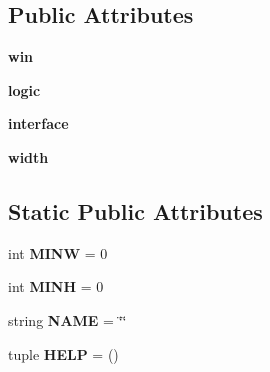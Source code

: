 \subsection*{\-Public \-Attributes}
\begin{DoxyCompactItemize}
\item 
\hypertarget{classplugins_1_1plugincurses_1_1_curses_plugin_a6bce789b5316e34676d0d2a3f3268ae9}{{\bfseries win}}\label{classplugins_1_1plugincurses_1_1_curses_plugin_a6bce789b5316e34676d0d2a3f3268ae9}

\item 
\hypertarget{classplugins_1_1plugincurses_1_1_curses_plugin_ae119ba111e0adc563144ec81fadb2c89}{{\bfseries logic}}\label{classplugins_1_1plugincurses_1_1_curses_plugin_ae119ba111e0adc563144ec81fadb2c89}

\item 
\hypertarget{classplugins_1_1plugincurses_1_1_curses_plugin_a36a19c75fe901ff81d68fb35048b5498}{{\bfseries interface}}\label{classplugins_1_1plugincurses_1_1_curses_plugin_a36a19c75fe901ff81d68fb35048b5498}

\item 
\hypertarget{classplugins_1_1plugincurses_1_1_curses_plugin_adc1318d78532f6d204e2290ec934f54b}{{\bfseries width}}\label{classplugins_1_1plugincurses_1_1_curses_plugin_adc1318d78532f6d204e2290ec934f54b}

\end{DoxyCompactItemize}
\subsection*{\-Static \-Public \-Attributes}
\begin{DoxyCompactItemize}
\item 
\hypertarget{classplugins_1_1plugincurses_1_1_curses_plugin_ad61b4ee3046c6e4e18a8b141c34f8346}{int {\bfseries \-M\-I\-N\-W} = 0}\label{classplugins_1_1plugincurses_1_1_curses_plugin_ad61b4ee3046c6e4e18a8b141c34f8346}

\item 
\hypertarget{classplugins_1_1plugincurses_1_1_curses_plugin_aaf98cf7e436034e64a826f45788f552c}{int {\bfseries \-M\-I\-N\-H} = 0}\label{classplugins_1_1plugincurses_1_1_curses_plugin_aaf98cf7e436034e64a826f45788f552c}

\item 
\hypertarget{classplugins_1_1plugincurses_1_1_curses_plugin_a3fafd023218d80a52ce065834419af31}{string {\bfseries \-N\-A\-M\-E} = \char`\"{}\char`\"{}}\label{classplugins_1_1plugincurses_1_1_curses_plugin_a3fafd023218d80a52ce065834419af31}

\item 
\hypertarget{classplugins_1_1plugincurses_1_1_curses_plugin_a9485e5b170314ef92c543014a23e5e1c}{tuple {\bfseries \-H\-E\-L\-P} = ()}\label{classplugins_1_1plugincurses_1_1_curses_plugin_a9485e5b170314ef92c543014a23e5e1c}

\end{DoxyCompactItemize}



